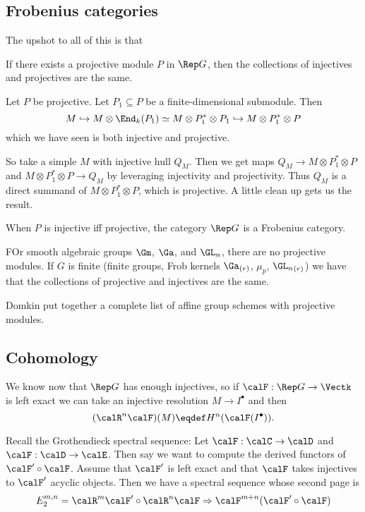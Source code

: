 \documentclass[12pt]{article}
\begin{document}
\subsection{Frobenius categories}
The upshot to all of this is that 
\begin{prop}
	If there exists a projective module $P$ in $\Rep G$, then the collections of injectives and projectives are the same.
\end{prop}
\begin{prf}
	Let $P$ be projective. Let $P_1\subseteq P$ be a finite-dimensional submodule. Then 
	\[M\hookrightarrow M\otimes \End_k(P_1)\simeq M\otimes P_1^\ast\otimes P_1\hookrightarrow M\otimes P_1^\ast\otimes P\]
	which we have seen is both injective and projective.

	So take a simple $M$ with injective hull $Q_M$. Then we get maps $Q_M\to M\otimes P_1^\ast\otimes P$ and $M\otimes P_1^\ast\otimes P\to Q_M$ 
	by leveraging injectivity and projectivity. Thus $Q_M$ is a direct summand of $M\otimes P_1^\ast\otimes P$, which is projective. 
	A little clean up gets us the result.
\end{prf}

\begin{rmk}
	When $P$ is injective iff projective, the category $\Rep G$ is a Frobenius category.
\end{rmk}

\begin{rmk}
	FOr smooth algebraic groups $\Gm$, $\Ga$, and $\GL_n$, there are no projective modules.
	If $G$ is finite (finite groups, Frob kernels ${\Ga}_{(r)}$, $\mu_p$, ${\GL_n}_{(r)}$) we have that the collections of projective and injectives are the same.
\end{rmk}
\begin{rmk}
Domkin put together a complete list of affine group schemes with projective modules.
\end{rmk}

\subsection{Cohomology}
We know now that $\Rep G$ has enough injectives, so if $\calF:\Rep G\to \Vectk$ is left exact we can take an 
injective resolution $M\to I^\bullet$ and then 
\[(\calR^n\calF)(M)\eqdef H^n(\calF(I^\bullet)).\]

Recall the Grothendieck spectral sequence:  Let $\calF:\calC\to \calD$ and $\calF:\calD\to \calE$. Then say 
we want to compute the derived functors of $\calF'\circ\calF$. Assume that $\calF'$ is left exact and that 
$\calF$ takes injectives to $\calF'$ acyclic objects. Then we have a spectral sequence whose second page is 
\[E_2^{m,n}=\calR^m\calF'\circ\calR^n\calF\Rightarrow \calF^{m+n}(\calF'\circ\calF)\]
\end{document}
